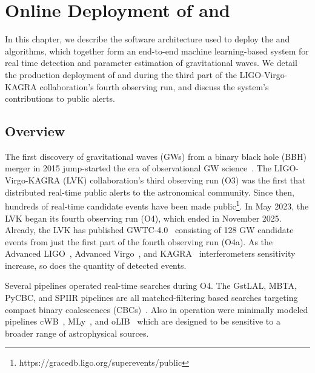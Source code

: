 \chapter{Online Deployment of \aframe and \amplfi}
\label{chap:online}
\begin{refsection}

In this chapter, we describe the software architecture used to deploy the \aframe and \amplfi algorithms, which together form an end-to-end machine learning-based system for real time detection and parameter estimation of gravitational waves. 
We detail the production deployment of \aframe and \amplfi during the third part of the LIGO-Virgo-KAGRA collaboration's fourth observing run, and discuss the system's contributions to public alerts. 

\section{Overview}
The first discovery of gravitational waves (GWs) from a binary black hole (BBH) merger in 2015 jump-started the era of observational GW science~\cite{AbEA2016a}. 
The LIGO-Virgo-KAGRA (LVK) collaboration's third observing run (O3) was the first that distributed real-time public alerts to the astronomical community. 
Since then, hundreds of real-time candidate events have been made public\footnote{https://gracedb.ligo.org/superevents/public}. 
In May 2023, the LVK began its fourth observing run (O4), which ended in November 2025. 
Already, the LVK has published GWTC-4.0~\cite{gwtc-4} consisting of 128 GW candidate events from just the first part of the fourth observing run (O4a). 
As the Advanced LIGO~\cite{buikema2020sensitivity, Aasi_2015}, Advanced Virgo~\cite{Acernese_2015}, and KAGRA~\cite{kagra} interferometers sensitivity increase, so does the quantity of detected events. 

Several pipelines operated real-time searches during O4. 
The GstLAL, MBTA, PyCBC, and SPIIR pipelines are all matched-filtering based searches targeting compact binary coalescences (CBCs)~\cite{Tsukada_2023, Allene_2025, Dal_Canton_2021, PhysRevD.105.024023}. 
Also in operation were minimally modeled pipelines cWB~\cite{PhysRevD.93.042004, PhysRevD.105.083018}, MLy~\cite{PhysRevD.110.104034}, and oLIB~\cite{Lynch:2015yin} which are designed to be sensitive to a broader range of astrophysical sources. 



\end{refsection}
